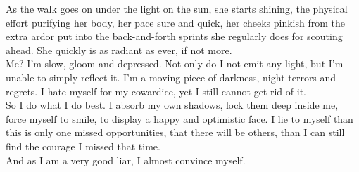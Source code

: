 \documentclass{report}
\begin{document}
As the walk goes on under the light on the sun, she starts shining, the physical effort purifying her body, her pace sure and quick, her cheeks pinkish from the extra ardor put into the back-and-forth sprints she regularly does for scouting ahead. She quickly is as radiant as ever, if not more.\\

Me? I'm slow, gloom and depressed. Not only do I not emit any light, but I'm unable to simply reflect it. I'm a moving piece of darkness, night terrors and regrets. I hate myself for my cowardice, yet I still cannot get rid of it.\\

So I do what I do best. I absorb my own shadows, lock them deep inside me, force myself to smile, to display a happy and optimistic face. I lie to myself than this is only one missed opportunities, that there will be others, than I can still find the courage I missed that time.\\

And as I am a very good liar, I almost convince myself.
\end{document}

